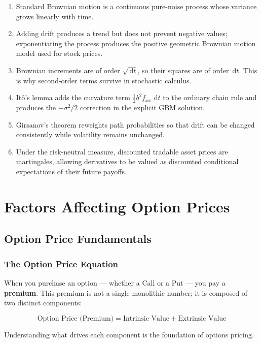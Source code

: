 \documentclass[12pt,openany]{book}
\theoremstyle{definition}
\theoremstyle{remark}
\newcommand{\dd}{\,\mathrm{d}}
\begin{document}
\begin{enumerate}
    \item Standard Brownian motion is a continuous pure-noise process whose
    variance grows linearly with time.

    \item Adding drift produces a trend but does not prevent negative values;
    exponentiating the process produces the positive geometric Brownian
    motion model used for stock prices.

    \item Brownian increments are of order \(\sqrt{\dd t}\), so their squares
    are of order \(\dd t\).  This is why second-order terms survive in
    stochastic calculus.

    \item Itô's lemma adds the curvature term
    \(\tfrac12b^2f_{xx}\,\dd t\) to the ordinary chain rule and produces the
    \(-\sigma^2/2\) correction in the explicit GBM solution.

    \item Girsanov's theorem reweights path probabilities so that drift can
    be changed consistently while volatility remains unchanged.

    \item Under the risk-neutral measure, discounted tradable asset prices
    are martingales, allowing derivatives to be valued as discounted
    conditional expectations of their future payoffs.
\end{enumerate}

\chapter{Factors Affecting Option Prices}

\section{Option Price Fundamentals}
\subsection{The Option Price Equation}
When you purchase an option --- whether a Call or a Put --- you pay a \textbf{premium}. This premium is not a single monolithic number; it is composed of two distinct components:

\[
\boxed{\text{Option Price (Premium)} = \text{Intrinsic Value} + \text{Extrinsic Value}}
\]

Understanding what drives each component is the foundation of options pricing.
\end{document}
